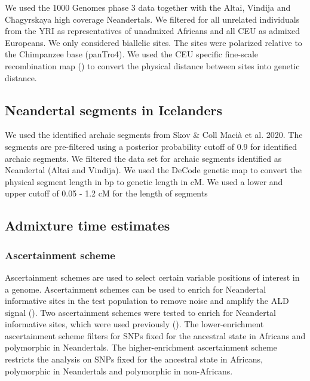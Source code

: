 \documentclass[]{article}
\begin{document}
We used the 1000 Genomes phase 3 data together with the Altai, Vindija and Chagyrskaya high coverage Neandertals.  We filtered for all unrelated individuals from the YRI as representatives of unadmixed Africans and all CEU as admixed Europeans. We only considered biallelic sites. The sites were polarized relative to the Chimpanzee base (panTro4). We used the CEU specific fine-scale recombination map (\cite{spence_inference_2019}) to convert the physical distance between sites into genetic distance. 

\subsection{Neandertal segments in Icelanders}\label{1000 Genomes Data}

We used the identified archaic segments from Skov \& Coll Maci\`{a} et al. 2020. The segments are pre-filtered using a posterior probability cutoff of 0.9 for identified archaic segments. We filtered the data set for archaic segments identified as Neandertal (Altai and Vindija). We used the DeCode genetic map to convert the physical segment length in bp to genetic length in cM. We used a lower and upper cutoff of 0.05 - 1.2 cM for the length of segments

\subsection{Admixture time estimates}\label{admixture time estimates}

\subsubsection{Ascertainment scheme}\label{asceteinment scheme}

Ascertainment schemes are used to select certain variable positions of
interest in a genome. Ascertainment schemes can be used to enrich for
Neandertal informative sites in the test population to remove noise and
amplify the ALD signal (\cite{sankararaman_date_2012}). Two
ascertainment schemes were tested to enrich for Neandertal informative
sites, which were used previously
(\cite{sankararaman_date_2012,fu_genome_2014}). The lower-enrichment
ascertainment scheme filters for SNPs fixed for the ancestral state in
Africans and polymorphic in Neandertals. The higher-enrichment
ascertainment scheme restricts the analysis on SNPs fixed for the
ancestral state in Africans, polymorphic in Neandertals and polymorphic
in non-Africans.
\end{document}
